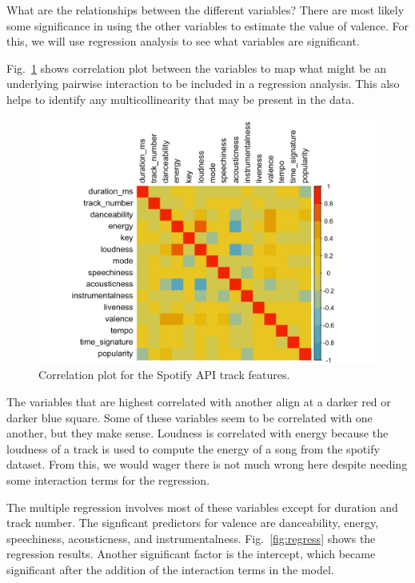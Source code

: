 \documentclass[conference]{IEEEtran}
\begin{document}
What are the relationships between the different variables? There are most likely some significance in using the other variables to estimate the value of valence. For this, we will use regression analysis to see what variables are significant. 

Fig.~\ref{fig:corrplot} shows correlation plot between the variables to map what might be an underlying pairwise interaction to be included in a regression analysis. This also helps to identify any multicollinearity that may be present in the data. 

\begin{figure}[htbp]
\centerline{\includegraphics[width = \columnwidth]{spotify-images/multicollinear}}
\caption{Correlation plot for the Spotify API track features.}
\label{fig:corrplot}
\end{figure}

The variables that are highest correlated with another align at a darker red or darker blue square. Some of these variables seem to be correlated with one another, but they make sense. Loudness is correlated with energy because the loudness of a track is used to compute the energy of a song from the spotify dataset. From this, we would wager there is not much wrong here despite needing some interaction terms for the regression. 

The multiple regression involves most of these variables except for duration and track number. The signficant predictors for valence are danceability, energy, speechiness, acousticness, and instrumentalness.  Fig.~\ref{fig:regress} shows the regression results. Another significant factor is the intercept, which became significant after the addition of the interaction terms in the model. 
\end{document}
